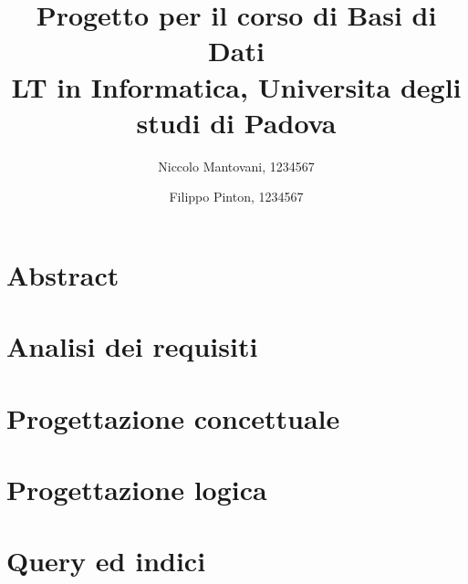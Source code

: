\documentclass[a4paper,10pt]{article}
\begin{document}
\title{%
    Progetto per il corso di Basi di Dati \\
    \large LT in Informatica, Universita degli studi di Padova}
\author{Niccolo Mantovani, 1234567
    \and
    Filippo Pinton, 1234567}
\date{}

\maketitle

\tableofcontents

\section{Abstract}


\section{Analisi dei requisiti}


\section{Progettazione concettuale}


\section{Progettazione logica}


\section{Query ed indici}

\end{document}
